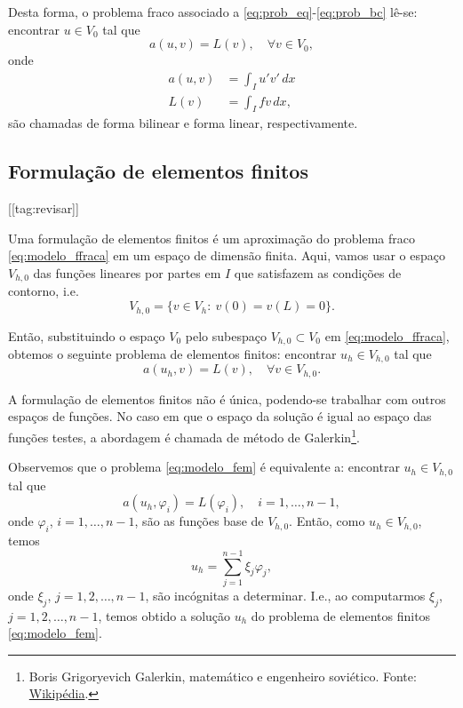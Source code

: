 Desta forma, o problema fraco associado a \eqref{eq:prob_eq}-\eqref{eq:prob_bc} lê-se: encontrar $u\in V_0$ tal que
\begin{equation}\label{eq:modelo_ffraca}
  a(u,v) = L(v),\quad\forall v\in V_0,
\end{equation}
onde
\begin{align}
  a(u,v) &= \int_I u'v'\,dx\label{eq:modelo_fbilinear}\\
  L(v) &= \int_I fv\,dx,\label{eq:modelo_flinear}
\end{align}
são chamadas de forma bilinear e forma linear, respectivamente.

\subsection{Formulação de elementos finitos}
[[tag:revisar]]

Uma formulação de elementos finitos é um aproximação do problema fraco \eqref{eq:modelo_ffraca} em um espaço de dimensão finita. Aqui, vamos usar o espaço $V_{h,0}$ das funções lineares por partes em $I$ que satisfazem as condições de contorno, i.e.
\begin{equation}
  V_{h,0} = \{v\in V_h:~v(0)=v(L)=0\}.
\end{equation}

Então, substituindo o espaço $V_0$ pelo subespaço $V_{h,0}\subset V_0$ em \eqref{eq:modelo_ffraca}, obtemos o seguinte problema de elementos finitos: encontrar $u_h\in V_{h,0}$ tal que
\begin{equation}\label{eq:modelo_fem}
  a(u_h,v) = L(v),\quad\forall v\in V_{h,0}.
\end{equation}

\begin{obs}
  A formulação de elementos finitos não é única, podendo-se trabalhar com outros espaços de funções. No caso em que o espaço da solução é igual ao espaço das funções testes, a abordagem é chamada de método de Galerkin\footnote{Boris Grigoryevich Galerkin, matemático e engenheiro soviético. Fonte: \href{https://pt.wikipedia.org/wiki/Boris_Galerkin}{Wikipédia}.}.
\end{obs}

Observemos que o problema \eqref{eq:modelo_fem} é equivalente a: encontrar $u_h\in V_{h,0}$ tal que
\begin{equation}
  a(u_h,\varphi_i) = L(\varphi_i),\quad i=1, \dotsc, n-1,
\end{equation}
onde $\varphi_i$, $i=1,\dotsc,n-1$, são as funções base de $V_{h,0}$. Então, como $u_h\in V_{h,0}$, temos
\begin{equation}
  u_h = \sum_{j=1}^{n-1}\xi_j\varphi_j,
\end{equation}
onde $\xi_j$, $j=1,2,\dotsc,n-1$, são incógnitas a determinar. I.e., ao computarmos $\xi_j$, $j=1,2,\dotsc,n-1$, temos obtido a solução $u_h$ do problema de elementos finitos \ref{eq:modelo_fem}.

